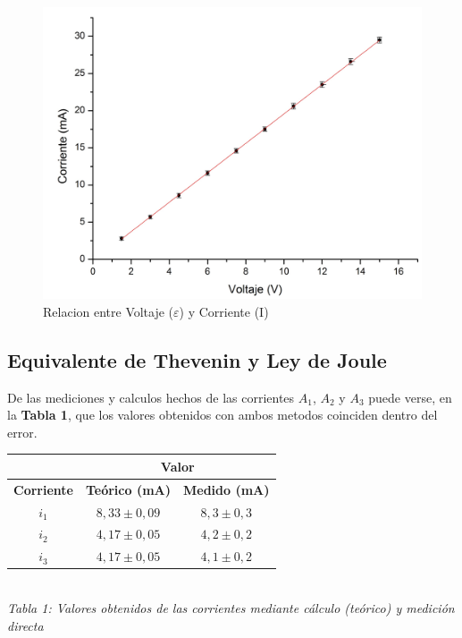 \documentclass[11pt,a4paper]{article}
\begin{document}
\begin{figure}[h]
  \centering
  \includegraphics[scale=0.4]{Corriente_vs_Voltaje}
  \caption{Relacion entre Voltaje ($\varepsilon$) y Corriente (I)}
  \label{fig:Ohm_lin}
\end{figure}




\subsection{Equivalente de Thevenin y Ley de Joule}

 
De las mediciones y calculos hechos de las corrientes $A_1$, $A_2$ y $A_3$ puede verse, en la \textbf{Tabla 1}, que los valores obtenidos con ambos metodos coinciden dentro del error. 

\begin{center}
\begin{tabular}{||c|c|c||}
\hline
& \multicolumn{2}{c||}{\textbf{Valor}} \\ \hline
\textbf{Corriente} & \textbf{Teórico (mA)} & \textbf{Medido (mA)} \\ \hline 
$i_1$ & $8,33\pm0,09$ & $8,3\pm0,3$ \\ \hline 
$i_2$ & $4,17\pm0,05$ & $4,2\pm0,2$ \\ \hline 
$i_3$ & $4,17\pm0,05$ & $4,1\pm0,2$ \\ \hline 
\end{tabular}\\

\textit{Tabla 1: Valores obtenidos de las corrientes mediante cálculo (teórico) y medición directa}
\end{center}
\end{document}

